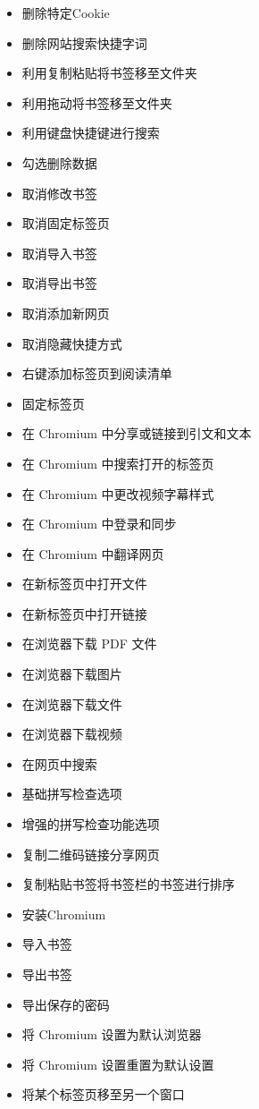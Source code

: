 \documentclass{article}
\begin{document}
\begin{itemize}
    \item 删除特定Cookie
    \item 删除网站搜索快捷字词
    \item 利用复制粘贴将书签移至文件夹
    \item 利用拖动将书签移至文件夹
    \item 利用键盘快捷键进行搜索
    \item 勾选删除数据
    \item 取消修改书签
    \item 取消固定标签页
    \item 取消导入书签
    \item 取消导出书签
    \item 取消添加新网页
    \item 取消隐藏快捷方式
    \item 右键添加标签页到阅读清单
    \item 固定标签页
    \item 在 Chromium 中分享或链接到引文和文本
    \item 在 Chromium 中搜索打开的标签页
    \item 在 Chromium 中更改视频字幕样式
    \item 在 Chromium 中登录和同步
    \item 在 Chromium 中翻译网页
    \item 在新标签页中打开文件
    \item 在新标签页中打开链接
    \item 在浏览器下载 PDF 文件
    \item 在浏览器下载图片
    \item 在浏览器下载文件
    \item 在浏览器下载视频
    \item 在网页中搜索
    \item 基础拼写检查选项
    \item 增强的拼写检查功能选项
    \item 复制二维码链接分享网页
    \item 复制粘贴书签将书签栏的书签进行排序
    \item 安装Chromium
    \item 导入书签
    \item 导出书签
    \item 导出保存的密码
    \item 将 Chromium 设置为默认浏览器
    \item 将 Chromium 设置重置为默认设置
    \item 将某个标签页移至另一个窗口

\end{itemize}
\end{document}
